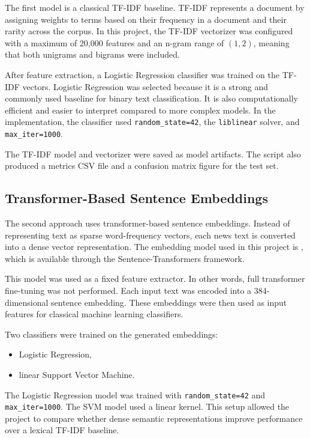 \documentclass[11pt]{article}
\begin{document}
The first model is a classical TF-IDF baseline. TF-IDF represents a document by assigning weights to terms based on their frequency in a document and their rarity across the corpus. In this project, the TF-IDF vectorizer was configured with a maximum of 20,000 features and an n-gram range of $(1,2)$, meaning that both unigrams and bigrams were included.

After feature extraction, a Logistic Regression classifier was trained on the TF-IDF vectors. Logistic Regression was selected because it is a strong and commonly used baseline for binary text classification. It is also computationally efficient and easier to interpret compared to more complex models. In the implementation, the classifier used \texttt{random\_state=42}, the \texttt{liblinear} solver, and \texttt{max\_iter=1000}.

The TF-IDF model and vectorizer were saved as model artifacts. The script also produced a metrics CSV file and a confusion matrix figure for the test set.

\subsection{Transformer-Based Sentence Embeddings}

The second approach uses transformer-based sentence embeddings. Instead of representing text as sparse word-frequency vectors, each news text is converted into a dense vector representation. The embedding model used in this project is , which is available through the Sentence-Transformers framework.

This model was used as a fixed feature extractor. In other words, full transformer fine-tuning was not performed. Each input text was encoded into a 384-dimensional sentence embedding. These embeddings were then used as input features for classical machine learning classifiers.

Two classifiers were trained on the generated embeddings:

\begin{itemize}
    \item Logistic Regression,
    \item linear Support Vector Machine.
\end{itemize}

The Logistic Regression model was trained with \texttt{random\_state=42} and \texttt{max\_iter=1000}. The SVM model used a linear kernel. This setup allowed the project to compare whether dense semantic representations improve performance over a lexical TF-IDF baseline.
\end{document}
